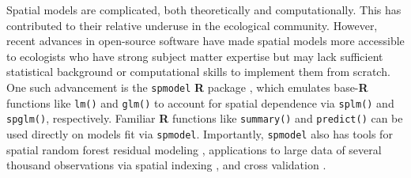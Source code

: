 \documentclass[
  letterpaper,
  DIV=11,
  numbers=noendperiod]{scrartcl}
\begin{document}
\begin{table}

\caption{\label{tbl-glm-families}Common generalized linear model
families, link functions, and appropriate data types.}


\end{table}%

Spatial models are complicated, both theoretically and computationally.
This has contributed to their relative underuse in the ecological
community. However, recent advances in open-source software have made
spatial models more accessible to ecologists who have strong subject
matter expertise but may lack sufficient statistical background or
computational skills to implement them from scratch. One such
advancement is the \texttt{spmodel} \textbf{R} package
\citep{dumelle2023spmodel}, which emulates base-\textbf{R} functions
like \texttt{lm()} and \texttt{glm()} to account for spatial dependence
via \texttt{splm()} and \texttt{spglm()}, respectively. Familiar
\textbf{R} functions like \texttt{summary()} and \texttt{predict()} can
be used directly on models fit via \texttt{spmodel}. Importantly,
\texttt{spmodel} also has tools for spatial random forest residual
modeling \citep{fox2020comparing}, applications to large data of several
thousand observations via spatial indexing \citep{ver2023indexing}, and
cross validation \citep{stone1974cross, roberts2017cross}.
\end{document}
